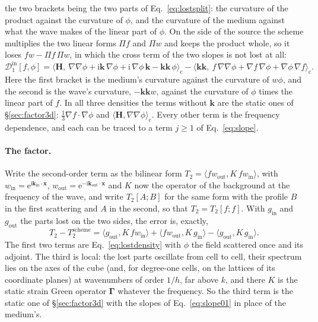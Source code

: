 \documentclass[11pt,a4paper]{article}
\newcommand{\bk}{\mathbf{k}}
\newcommand{\bx}{\mathbf{x}}
\begin{document}
the two brackets being the two parts of Eq.~\eqref{eq:lostsplit}: the curvature of the product against
the curvature of $\phi$, and the curvature of the medium against what the wave makes of the linear part
of $\phi$. On the side of the source the scheme multiplies the two linear forms $\Pi f$ and $\Pi w$ and
keeps the product whole, so it loses $fw-\Pi f\,\Pi w$, in which the cross term of the two slopes is not
lost at all:
\begin{equation}\label{eq:D1in}
  \mathcal{D}_1^{\mathrm{in}}[f,\phi]
  =\bigl\langle\mathbf{H},\ \nabla\nabla\phi+\mathrm{i}\bk\,\nabla\phi+\mathrm{i}\,\nabla\phi\,\bk-\bk\bk\,\phi\bigr\rangle_{\mathrm{c}}
  -\bigl\langle\bk\bk,\ f\,\nabla\nabla\phi+\nabla f\,\nabla\phi+\nabla\phi\,\nabla f\bigr\rangle_{\mathrm{c}} .
\end{equation}
Here the first bracket is the medium's curvature against the curvature of $w\phi$, and the second is the
wave's curvature, $-\bk\bk w$, against the curvature of $\phi$ times the linear part of $f$. In all three
densities the terms without $\bk$ are the static ones of \S\ref{sec:factor3d}:
$\tfrac13\nabla f\cdot\nabla\phi$ and $\langle\mathbf{H},\nabla\nabla\phi\rangle_{\mathrm{c}}$. Every other
term is the frequency dependence, and each can be traced to a term $j\ge1$ of Eq.~\eqref{eq:slope}.

\paragraph{The factor.} Write the second-order term as the bilinear form
$T_2=\langle fw_{\mathrm{out}},K\,fw_{\mathrm{in}}\rangle$, with
$w_{\mathrm{in}}=\mathrm{e}^{\mathrm{i}\bk_{\mathrm{in}}\cdot\bx}$,
$w_{\mathrm{out}}=\mathrm{e}^{-\mathrm{i}\bk_{\mathrm{out}}\cdot\bx}$ and $K$ now the operator of the
background at the frequency of the wave, and write $T_2[A;B]$ for the same form with the profile $B$ in
the first scattering and $A$ in the second, so that $T_2=T_2[f;f]$. With $g_{\mathrm{in}}$ and
$g_{\mathrm{out}}$ the parts lost on the two sides, the error is, exactly,
\begin{equation}\label{eq:t2split}
  T_2-T_2^{\mathrm{scheme}}=\langle g_{\mathrm{out}},K\,fw_{\mathrm{in}}\rangle
  +\langle fw_{\mathrm{out}},K\,g_{\mathrm{in}}\rangle-\langle g_{\mathrm{out}},K\,g_{\mathrm{in}}\rangle .
\end{equation}
The first two terms are Eq.~\eqref{eq:lostdensity} with $\phi$ the field scattered once and its adjoint.
The third is local: the lost parts oscillate from cell to cell, their spectrum lies on the axes of the
cube (and, for degree-one cells, on the lattices of its coordinate planes) at wavenumbers of order $1/h$,
far above $k$, and there $K$ is the static strain Green operator $\boldsymbol\Gamma$ whatever the
frequency. So the third term is the static one of \S\ref{sec:factor3d} with the slopes of
Eq.~\eqref{eq:slope01} in place of the medium's.
\end{document}
